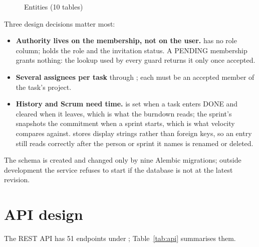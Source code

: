 \documentclass[../main.tex]{subfiles}
\begin{document}
\begin{figure}[H]
\caption{Entities (10 tables)}\label{fig:er}
\end{figure}

Three design decisions matter most:
\begin{itemize}
  \item \textbf{Authority lives on the membership, not on the user.}  has no role
        column;  holds the role and the invitation status. A PENDING
        membership grants nothing: the lookup used by every guard returns it only once accepted.
  \item \textbf{Several assignees per task} through ; each must be an
        accepted member of the task's project.
  \item \textbf{History and Scrum need time.}  is set when a task
        enters DONE and cleared when it leaves, which is what the burndown reads;
        the sprint's  snapshots the commitment when a sprint starts, which is
        what velocity compares against.  stores display strings rather than
        foreign keys, so an entry still reads correctly after the person or sprint it names is
        renamed or deleted.
\end{itemize}
The schema is created and changed only by nine Alembic migrations; outside development the
service refuses to start if the database is not at the latest revision.

\section{API design}
The REST API has 51 endpoints under ; Table~\ref{tab:api} summarises them.
\end{document}

